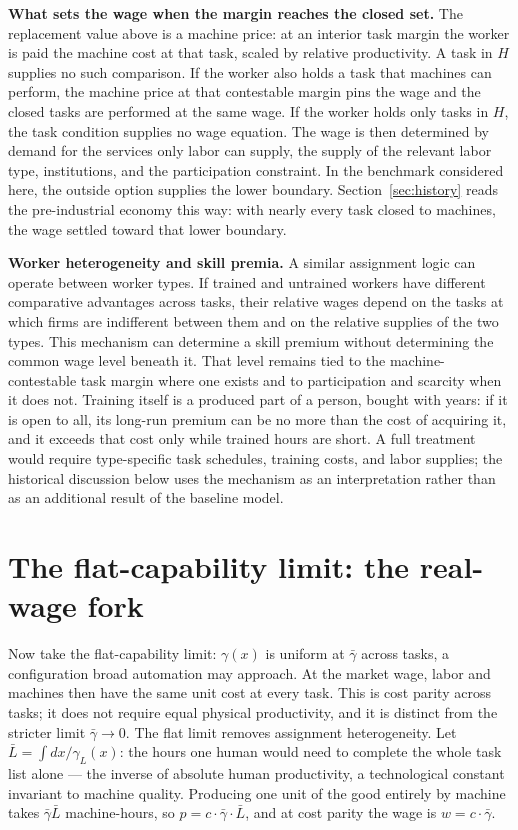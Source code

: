 \documentclass[12pt]{article}
\theoremstyle{plain}
\begin{document}
\textbf{What sets the wage when the margin reaches the closed set.}
The replacement value above is a machine price: at an interior task margin the worker
is paid the machine cost at that task, scaled by relative productivity. A
task in $H$ supplies no such comparison. If the worker also holds a task that
machines can perform, the machine price at that contestable margin pins the
wage and the closed tasks are performed at the same wage. If the worker holds
only tasks in $H$, the task condition supplies no wage equation. The wage is
then determined by demand for the services only labor can supply, the supply
of the relevant labor type, institutions, and the participation constraint.
In the benchmark considered here, the outside option supplies the lower
boundary. Section~\ref{sec:history} reads the pre-industrial economy this
way: with nearly every task closed to machines, the wage settled toward that
lower boundary.

\textbf{Worker heterogeneity and skill premia.}
A similar assignment logic can operate between worker types. If trained and
untrained workers have different comparative advantages across tasks, their
relative wages depend on the tasks at which firms are indifferent between
them and on the relative supplies of the two types. This mechanism can
determine a skill premium without determining the common wage level beneath
it. That level remains tied to the machine-contestable task margin where one
exists and to participation and scarcity when it does not. Training itself is
a produced part of a person, bought with years: if it is open to all, its
long-run premium can be no more than the cost of acquiring it, and it exceeds
that cost only while trained hours are short. A full treatment would require
type-specific task schedules, training costs, and labor supplies; the
historical discussion below uses the mechanism as an interpretation rather
than as an additional result of the baseline model.

\section{The flat-capability limit: the real-wage fork}\label{sec:limit}

Now take the flat-capability limit: $\gamma(x)$ is uniform at $\bar{\gamma}$ across tasks, a configuration broad automation may approach. At the market wage, labor and machines then have the same unit cost at every task. This is cost parity across tasks; it does not require equal physical productivity, and it is distinct from the stricter limit $\bar{\gamma}\to0$. The flat limit removes assignment heterogeneity. Let $\bar{L} = \int dx/\gamma _L(x)$: the hours one human would need to complete the whole task list alone --- the inverse of absolute human productivity, a technological constant invariant to machine quality. Producing one unit of the good entirely by machine takes $\bar{\gamma}\bar{L}$ machine-hours, so $p = c\cdot \bar{\gamma}\cdot \bar{L}$, and at cost parity the wage is $w = c\cdot \bar{\gamma}$.
\end{document}
